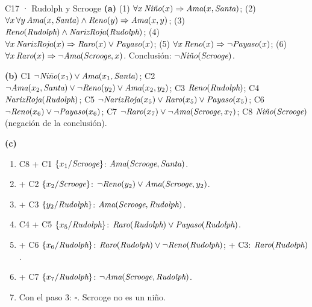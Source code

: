 \begin{solucion}{C17 · Rudolph y Scrooge}
\textbf{(a)} (1) $\forall x\,\textit{Niño}(x)\Rightarrow\textit{Ama}(x,\textit{Santa})$; (2) $\forall x\,\forall y\,\textit{Ama}(x,\textit{Santa})\wedge\textit{Reno}(y)\Rightarrow\textit{Ama}(x,y)$;
(3) $\textit{Reno}(\textit{Rudolph})\wedge\textit{NarizRoja}(\textit{Rudolph})$; (4) $\forall x\,\textit{NarizRoja}(x)\Rightarrow\textit{Raro}(x)\vee\textit{Payaso}(x)$;
(5) $\forall x\,\textit{Reno}(x)\Rightarrow\neg\textit{Payaso}(x)$; (6) $\forall x\,\textit{Raro}(x)\Rightarrow\neg\textit{Ama}(\textit{Scrooge},x)$.
Conclusión: $\neg\textit{Niño}(\textit{Scrooge})$.

\textbf{(b)} C1 $\neg\textit{Niño}(x_1)\vee\textit{Ama}(x_1,\textit{Santa})$; C2 $\neg\textit{Ama}(x_2,\textit{Santa})\vee\neg\textit{Reno}(y_2)\vee\textit{Ama}(x_2,y_2)$;
C3 $\textit{Reno}(\textit{Rudolph})$; C4 $\textit{NarizRoja}(\textit{Rudolph})$; C5 $\neg\textit{NarizRoja}(x_5)\vee\textit{Raro}(x_5)\vee\textit{Payaso}(x_5)$;
C6 $\neg\textit{Reno}(x_6)\vee\neg\textit{Payaso}(x_6)$; C7 $\neg\textit{Raro}(x_7)\vee\neg\textit{Ama}(\textit{Scrooge},x_7)$;
C8 $\textit{Niño}(\textit{Scrooge})$ (negación de la conclusión).

\textbf{(c)}
\begin{enumerate}[nosep]
\item C8 + C1 $\{x_1/\textit{Scrooge}\}$: $\textit{Ama}(\textit{Scrooge},\textit{Santa})$.
\item + C2 $\{x_2/\textit{Scrooge}\}$: $\neg\textit{Reno}(y_2)\vee\textit{Ama}(\textit{Scrooge},y_2)$.
\item + C3 $\{y_2/\textit{Rudolph}\}$: $\textit{Ama}(\textit{Scrooge},\textit{Rudolph})$.
\item C4 + C5 $\{x_5/\textit{Rudolph}\}$: $\textit{Raro}(\textit{Rudolph})\vee\textit{Payaso}(\textit{Rudolph})$.
\item + C6 $\{x_6/\textit{Rudolph}\}$: $\textit{Raro}(\textit{Rudolph})\vee\neg\textit{Reno}(\textit{Rudolph})$; + C3: $\textit{Raro}(\textit{Rudolph})$.
\item + C7 $\{x_7/\textit{Rudolph}\}$: $\neg\textit{Ama}(\textit{Scrooge},\textit{Rudolph})$.
\item Con el paso 3: $\square$. Scrooge no es un niño.
\end{enumerate}
\end{solucion}

